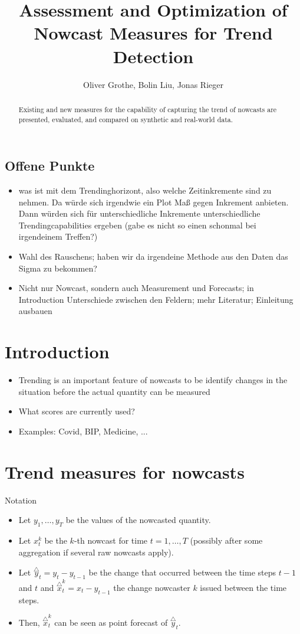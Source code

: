 \documentclass[oneside]{article}
\title{Assessment and Optimization of Nowcast Measures for Trend Detection}
\author{Oliver Grothe, Bolin Liu, Jonas Rieger}
\theoremstyle{plain}%
\theoremstyle{definition}
\newcommand{\ydiff}{\overset{\triangle}{y}}
\newcommand{\xdiff}{\overset{\triangle}{x}}
\begin{document}
\maketitle

\begin{abstract}
Existing and new measures for the capability of capturing the trend of nowcasts are presented, evaluated, and compared on synthetic and real-world data.
\end{abstract}

\subsection*{Offene Punkte}

\begin{itemize}
    \item was ist mit dem Trendinghorizont, also welche Zeitinkremente sind zu nehmen. Da würde sich irgendwie ein Plot Maß gegen Inkrement anbieten. Dann würden sich für unterschiedliche Inkremente unterschiedliche Trendingcapabilities ergeben (gabe es nicht so einen schonmal bei irgendeinem Treffen?)
    \item Wahl des Rauschens; haben wir da irgendeine Methode aus den Daten das Sigma zu bekommen?
    \item Nicht nur Nowcast, sondern auch Measurement und Forecasts; in Introduction Unterschiede zwischen den Feldern; mehr Literatur; Einleitung ausbauen
\end{itemize}

\section{Introduction}

\begin{itemize}
	\item Trending is an important feature of nowcasts to be identify changes in the situation before the actual quantity can be measured
	\item What scores are currently used?
	\item Examples: Covid, BIP, Medicine, ... 
\end{itemize}


\section{Trend measures for nowcasts}

Notation
\begin{itemize}
  \item Let $y_1, \ldots, y_T$ be the values of the nowcasted quantity.
  \item Let $x_t^k$ be the $k$-th nowcast for time $t = 1, \ldots, T$ (possibly after some aggregation if several raw nowcasts apply).
  \item Let $\ydiff_t = y_t - y_{t-1}$ be the change that occurred between the time steps $t-1$ and $t$ and $\xdiff_t^k = x_t - y_{t-1}$ the change nowcaster $k$ issued between the time steps. 
  \item Then, $\xdiff_t^k$ can be seen as point forecast of $\ydiff_t$. 
\end{itemize}
\end{document}
